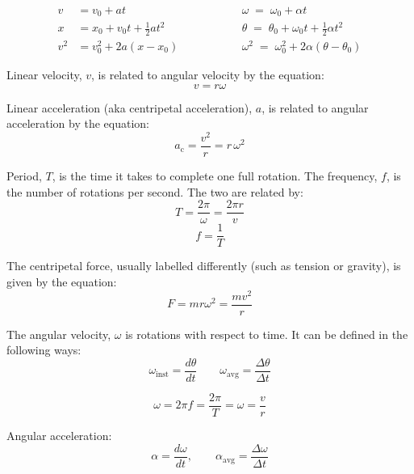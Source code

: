\begin{center}
    \begin{align}
      v &= v_0 + a t 
      &\qquad\qquad&
      \omega \;=\; \omega_0 + \alpha t \\[4pt]
      x &= x_0 + v_0 t + \tfrac12 a t^{2} 
      &&
      \theta \;=\; \theta_0 + \omega_0 t + \tfrac12 \alpha t^{2} \\[4pt]
      v^{2} &= v_0^{2} + 2a\!\left(x - x_0\right) 
      &&
      \omega^{2} \;=\; \omega_0^{2} + 2\alpha\!\left(\theta - \theta_0\right)
    \end{align}
\end{center}

Linear velocity, $v$, is related to angular velocity by the equation:
$$v = r \omega$$    

Linear acceleration (aka centripetal acceleration), $a$, is related to angular acceleration by the equation:
$$a_{\text{c}} = \frac{v^{2}}{r} = r\,\omega^{2}$$


Period, $T$, is the time it takes to complete one full rotation. The frequency, $f$, is the number of rotations per second. The two are related by:
$$T = \frac{2\pi}{\omega} = \frac{2\pi r}{v}$$
$$f = \frac{1}{T}$$

The centripetal force, usually labelled differently (such as tension or gravity), is given by the equation:
$$F = m r \omega^2 = \frac{m v^2}{r}$$


The angular velocity, $\omega$ is rotations with respect to time. It can be defined in the following ways:
\[
  {\omega_{\text{inst}} = \frac{d\theta}{dt}}
  \qquad
  {\omega_{\text{avg}} = \frac{\Delta\theta}{\Delta t}}
\]

\[
  {\omega = 2\pi f = \frac{2\pi}{T} = \omega = \frac{v}{r}}
\]

Angular acceleration:
\[
\alpha = \frac{d\omega}{dt}, \qquad
\alpha_{\text{avg}} = \frac{\Delta\omega}{\Delta t}
\]